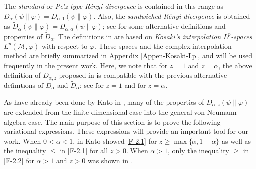 \documentclass[12pt]{article}
\theoremstyle{definition}
\theoremstyle{remark}
\numberwithin{equation}{section}
\def\Me{\mathcal M}
\begin{document}
The \emph{standard} or \emph{Petz-type R\'enyi divergence}
\cite{petz1985quasi,hiai2018quantum,hiai2021quantum} is contained in this range as
$D_\alpha(\psi\|\varphi)=D_{\alpha,1}(\psi\|\varphi)$. Also, the \emph{sandwiched R\'enyi divergence} is
obtained as $\tilde D_\alpha(\psi\|\varphi)=D_{\alpha,\alpha}(\psi\|\varphi)$; see
\cite{berta2018renyi,hiai2021quantum,jencova2018renyi, jencova2021renyi} for some
alternative definitions and properties of $\tilde D_\alpha$. The definitions in
\cite{jencova2018renyi,jencova2021renyi} are based on \emph{Kosaki's interpolation $L^p$-spaces}
$L^p(\Me,\varphi)$ \cite{kosaki1984applications} with respect to $\varphi$. These spaces and the
complex interpolation method are briefly summarized in Appendix \ref{Appen-Kosaki-Lp}, and will be used
frequently in the present work. Here, we note that for $z=1$ and $z=\alpha$, the above
definition of $D_{\alpha,z}$ proposed in \cite{kato2023aremark, kato2023onrenyi} is compatible with the
previous alternative definitions of $D_\alpha$ and $\tilde D_\alpha$; see \cite[Theorem 3.6]{hiai2021quantum}
for $z=1$ and \cite[Lemma 9]{kato2023aremark} for $z=\alpha$.


As have already been done by Kato in \cite{kato2023onrenyi}, many of the properties of
$D_{\alpha,z}(\psi\|\varphi)$ are extended from the finite dimensional case into the general von Neumann
algebra case. The main purpose of this section is to prove the following
variational expressions. These expressions will provide
 an important tool for our work. When $0<\alpha<1$, in \cite{kato2023onrenyi} Kato showed \eqref{F-2.1} for
$z\ge\max\{\alpha,1-\alpha\}$ as well as the inequality $\le$ in \eqref{F-2.1} for all $z>0$. When $\alpha>1$,
only the inequality $\ge$ in \eqref{F-2.2} for $\alpha>1$ and $z>0$ was shown in \cite{kato2023onrenyi}.
\end{document}
